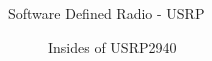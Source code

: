 \documentclass[10pt,t]{beamer}
\begin{document}
\begin{frame}{Software Defined Radio - USRP}
    \begin{figure}[H]
        \caption{Insides of USRP2940}
        \label{fig:SyncFail2Ch}%
    \end{figure}
\end{frame}
\end{document}
